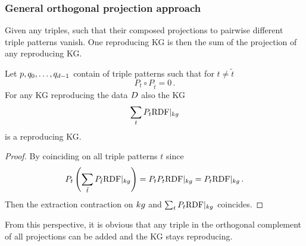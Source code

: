 \subsubsection{General orthogonal projection approach}

Given any triples, such that their composed projections to pairwise different triple patterns vanish. 
One reproducing KG is then the sum of the projection of any reproducing KG.



\begin{theorem}
	Let  $p,q_{0},\ldots,q_{d-1}$ contain of triple patterns such that for $t\neq \tilde{t}$
		\[ P_t \circ P_{\tilde{t}} = 0 \, . \]
	For any KG reproducing the data $D$ also the KG 
		\[ \sum_{t} P_t {\mathrm{RDF}}|_{kg} \]
	is a reproducing KG.
\end{theorem}
\begin{proof}
	By coinciding on all triple patterns $t$ since
		\[ P_t \left( \sum_{\tilde{t}} P_{\tilde{t}} {\mathrm{RDF}}|_{kg}  \right)  
		= P_t P_t {\mathrm{RDF}}|_{kg}  
		= P_t {\mathrm{RDF}}|_{kg}  \, .   \]
	Then the extraction contraction on $kg$ and $ \sum_{t} P_t{\mathrm{RDF}}|_{kg} $ coincides.
\end{proof}

From this perspective, it is obvious that any triple in the orthogonal complement of all projections can be added and the KG stays reproducing.


%
%




